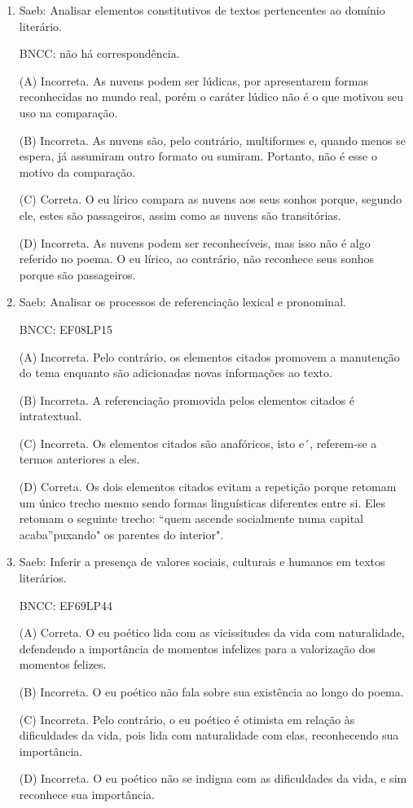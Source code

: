 \begin{enumerate}
\item

Saeb: Analisar elementos constitutivos de textos pertencentes ao domínio
literário.

BNCC: não há correspondência.

(A) Incorreta. As nuvens podem ser lúdicas, por apresentarem formas
reconhecidas no mundo real, porém o caráter lúdico não é o que motivou
seu uso na comparação.

(B) Incorreta. As nuvens são, pelo contrário, multiformes e, quando
menos se espera, já assumiram outro formato ou sumiram. Portanto, não é
esse o motivo da comparação.

(C) Correta. O eu lírico compara as nuvens aos seus sonhos porque,
segundo ele, estes são passageiros, assim como as nuvens são
transitórias.

(D) Incorreta. As nuvens podem ser reconhecíveis, mas isso não é algo
referido no poema. O eu lírico, ao contrário, não reconhece seus sonhos
porque são passageiros.


\item

Saeb: Analisar os processos de referenciação lexical e pronominal.

BNCC: EF08LP15

(A) Incorreta. Pelo contrário, os elementos citados promovem a
manutenção do tema enquanto são adicionadas novas informações ao texto.

(B) Incorreta. A referenciação promovida pelos elementos citados é
intratextual.

(C) Incorreta. Os elementos citados são anafóricos, isto e´, referem-se
a termos anteriores a eles.

(D) Correta. Os dois elementos citados evitam a repetição porque retomam
um único trecho mesmo sendo formas linguísticas diferentes entre si.
Eles retomam o seguinte trecho: ``quem ascende socialmente numa capital
acaba''puxando" os parentes do interior".

\item


Saeb: Inferir a presença de valores sociais, culturais e humanos em
textos literários.

BNCC: EF69LP44

(A) Correta. O eu poético lida com as vicissitudes da vida com
naturalidade, defendendo a importância de momentos infelizes para a
valorização dos momentos felizes.

(B) Incorreta. O eu poético não fala sobre sua existência ao longo do
poema.

(C) Incorreta. Pelo contrário, o eu poético é otimista em relação às
dificuldades da vida, pois lida com naturalidade com elas, reconhecendo
sua importância.

(D) Incorreta. O eu poético não se indigna com as dificuldades da vida,
e sim reconhece sua importância.

\end{enumerate}
